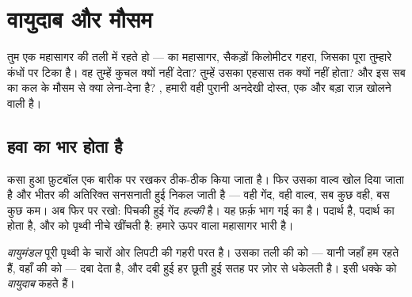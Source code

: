 \chapter{वायुदाब और मौसम}\label{ch:g5:air-pressure-weather}

तुम एक महासागर की तली में रहते हो ---  का महासागर, सैकड़ों
किलोमीटर गहरा, जिसका पूरा  तुम्हारे कंधों पर टिका है। वह तुम्हें
कुचल क्यों नहीं देता? तुम्हें उसका एहसास तक क्यों नहीं होता? और इस सब
का कल के मौसम से क्या लेना-देना है? , हमारी वही पुरानी अनदेखी
दोस्त, एक और बड़ा राज़ खोलने वाली है।

\section{हवा का भार होता है}

\begin{example}[अनदेखे को तौलना]\label{ex:g5:air-pressure-weather:weighing}
कसा हुआ फ़ुटबॉल एक बारीक  पर रखकर ठीक-ठीक  किया जाता है।
फिर उसका वाल्व खोल दिया जाता है और भीतर की अतिरिक्त  सनसनाती हुई
निकल जाती है --- वही गेंद, वही वाल्व, सब कुछ वही, बस कुछ  कम। अब
फिर  पर रखो: पिचकी हुई गेंद \emph{हल्की} है। यह फ़र्क़ भाग गई 
का  है।  पदार्थ है, पदार्थ का  होता है, और 
को पृथ्वी नीचे खींचती है: हमारे ऊपर वाला महासागर भारी है।
\end{example}

\begin{definition}[वायुमंडल और उसका दाब]\label{def:g5:air-pressure-weather:pressure}
\emph{वायुमंडल} पूरी पृथ्वी के चारों ओर लिपटी  की
गहरी परत है। उसका  तली की  को --- यानी जहाँ हम रहते हैं, वहाँ की
 को --- दबा देता है, और दबी हुई  हर छूती हुई सतह पर ज़ोर से
धकेलती है। इसी धक्के को \emph{वायुदाब} कहते हैं।
\end{definition}

